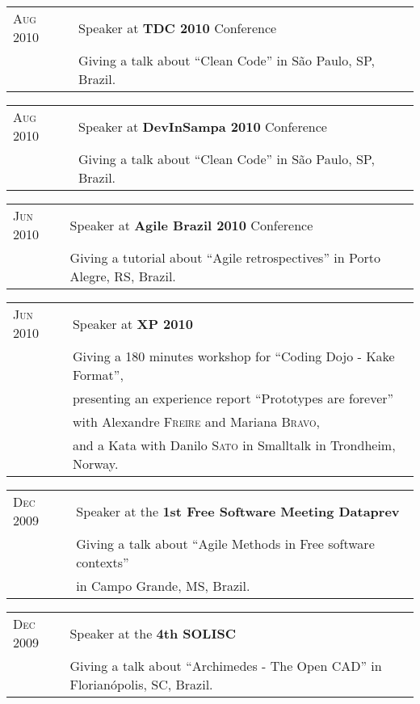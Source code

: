 \documentclass[letter,10pt]{article}
\begin{document}
\begin{tabular}{p{2.5cm}l}
  \textsc{Aug 2010} & Speaker at \textbf{TDC 2010} Conference\\
  &Giving a talk about ``Clean Code'' in São Paulo, SP, Brazil.\\
\end{tabular}

\begin{tabular}{p{2.5cm}l}
  \textsc{Aug 2010} & Speaker at \textbf{DevInSampa 2010} Conference\\
  &Giving a talk about ``Clean Code'' in São Paulo, SP, Brazil.\\
\end{tabular}

\begin{tabular}{p{2.5cm}l}
  \textsc{Jun 2010} & Speaker at \textbf{Agile Brazil 2010} Conference\\
  &Giving a tutorial about ``Agile retrospectives'' in Porto Alegre, RS, Brazil.\\
\end{tabular}

\begin{tabular}{p{2.5cm}l}
  \textsc{Jun 2010} & Speaker at \textbf{XP 2010}\\
  &Giving a 180 minutes workshop for ``Coding Dojo - Kake Format'',\\
  & presenting an experience report ``Prototypes are forever''\\
  & with Alexandre \textsc{Freire} and Mariana \textsc{Bravo},\\
  & and a Kata with Danilo \textsc{Sato} in Smalltalk in Trondheim, Norway.\\
\end{tabular}

\begin{tabular}{p{2.5cm}l}
  \textsc{Dec 2009} & Speaker at the \textbf{1st Free Software Meeting Dataprev}\\
  &Giving a talk about ``Agile Methods in Free software contexts''\\
  &in Campo Grande, MS, Brazil.\\
\end{tabular}

\begin{tabular}{p{2.5cm}l}
  \textsc{Dec 2009} & Speaker at the \textbf{4th SOLISC}\\
  &Giving a talk about ``Archimedes - The Open CAD'' in Florianópolis, SC, Brazil.\\
\end{tabular}
\end{document}
